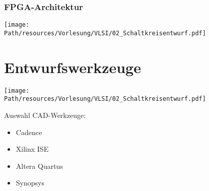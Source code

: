 	\subsubsection{FPGA-Architektur}	
		\begin{center}
			\texttt{[image: \\Path/resources/Vorlesung/VLSI/02\_Schaltkreisentwurf.pdf]}
		\end{center}
	
\section{Entwurfswerkzeuge}
	\begin{center}
		\texttt{[image: \\Path/resources/Vorlesung/VLSI/02\_Schaltkreisentwurf.pdf]}
	\end{center}
	Auswahl CAD-Werkzeuge:
	\begin{itemize}
		\item Cadence
		\item Xilinx ISE
		\item Altera Quartus
		\item Synopsys
	\end{itemize}
	
	
	
	
	
